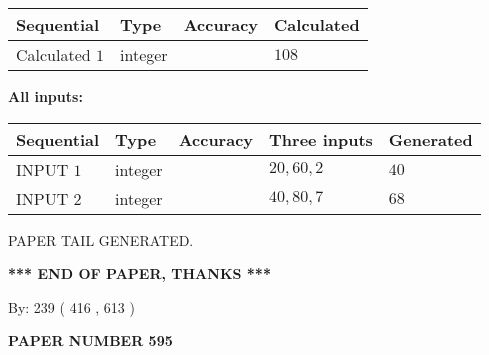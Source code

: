 \documentclass[12pt]{article}
\begin{document}
   
  
  
\noindent\begin{tabular}{|l|l|l|l|}
\hline
 Sequential & Type & Accuracy & Calculated \\ 
\hline
 
 
  Calculated $  1 $ & integer &  & 
  $ 108 $ 
 \\  \hline  
 \end{tabular}
   
   
   
   
\noindent\vspace{0.1in}\hspace{-0.08in} {\textbf{\Large{All inputs: }}}
   
   
  
  
\noindent\begin{tabular}{|l|l|l|l|l|}
\hline
 Sequential & Type & Accuracy & Three inputs & Generated \\ 
\hline
 
 
  INPUT $  1 $ & integer &  & $
 20
 , 
 60
 , 
 2
 $ & $ 40 $ 
 \\  \hline  
 
 
  INPUT $  2 $ & integer &  & $
 40
 , 
 80
 , 
 7
 $ & $ 68 $ 
 \\  \hline  
 \end{tabular}
   
   
   
   
   
   
 \vspace{0.2in}
 
   
   
\vspace{2.0in} PAPER TAIL GENERATED.
   
   
   
   
\vspace{1.0in} 
{\textbf{\large{ *** END OF PAPER, THANKS *** }}} 
   
   
\hspace{1.0in} By: 
 239 ( 416 ,  613 )
   
   
   
   
\newpage 
\setcounter{page}{ 
   595001 } 
   
   
   
   
 {\textbf{ \Large{ PAPER NUMBER  595  }}}
   
   
\vspace{0.2in}
   
   
   
\end{document}

